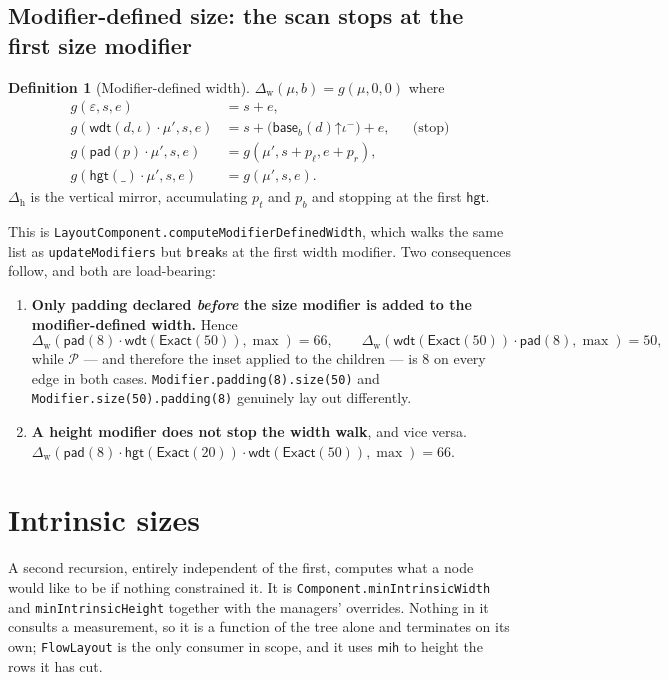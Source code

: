 \documentclass[11pt,a4paper]{article}
\newcommand{\Exact}{\mathsf{Exact}}
\newcommand{\pad}{\mathsf{pad}}
\newcommand{\wdt}{\mathsf{wdt}}
\newcommand{\hgt}{\mathsf{hgt}}
\newcommand{\mih}{\mathsf{mih}}
\newcommand{\Pp}{\mathcal{P}}          %
\newcommand{\Dw}{\Delta_{\mathrm{w}}}
\newcommand{\Dh}{\Delta_{\mathrm{h}}}
\newcommand{\base}{\mathsf{base}}
\newcommand{\clampL}{\mathord{\uparrow}}
\newcommand{\jv}[1]{\texttt{#1}}       %
\theoremstyle{definition}
\newtheorem{definition}{Definition}[section]
\theoremstyle{plain}
\theoremstyle{remark}
\begin{document}
\subsection{Modifier-defined size: the scan stops at the first size modifier}
\label{sec:orderquirk}

\begin{definition}[Modifier-defined width]
$\Dw(\mu, b) = g(\mu, 0, 0)$ where
\[
  \begin{aligned}
    g(\varepsilon, s, e) &= s + e, \\
    g(\wdt(d,\iota)\cdot\mu', s, e) &= s + \bigl(\base_b(d) \clampL \iota^-\bigr) + e,
      &&\text{(stop)} \\
    g(\pad(p)\cdot\mu', s, e) &= g(\mu', s + p_\ell, e + p_r), \\
    g(\hgt(\_)\cdot\mu', s, e) &= g(\mu', s, e).
  \end{aligned}
\]
$\Dh$ is the vertical mirror, accumulating $p_t$ and $p_b$ and stopping at the
first $\hgt$.
\end{definition}

This is \jv{LayoutComponent.computeModifierDefinedWidth}, which walks the same
list as \jv{updateModifiers} but \jv{break}s at the first width modifier. Two
consequences follow, and both are load-bearing:

\begin{enumerate}[leftmargin=1.6em]
  \item \textbf{Only padding declared \emph{before} the size modifier is added
    to the modifier-defined width.} Hence
    \[
      \Dw(\pad(8)\cdot\wdt(\Exact(50)), \max) = 66,
      \qquad
      \Dw(\wdt(\Exact(50))\cdot\pad(8), \max) = 50,
    \]
    while $\Pp$ --- and therefore the inset applied to the children --- is $8$ on
    every edge in both cases. \jv{Modifier.padding(8).size(50)} and
    \jv{Modifier.size(50).padding(8)} genuinely lay out differently.
  \item \textbf{A height modifier does not stop the width walk}, and vice versa.
    $\Dw(\pad(8)\cdot\hgt(\Exact(20))\cdot\wdt(\Exact(50)), \max) = 66$.
\end{enumerate}

\section{Intrinsic sizes}
\label{sec:intrinsic}

A second recursion, entirely independent of the first, computes what a node
would like to be if nothing constrained it. It is \jv{Component.minIntrinsicWidth}
and \jv{minIntrinsicHeight} together with the managers' overrides. Nothing in it
consults a measurement, so it is a function of the tree alone and terminates on
its own; \jv{FlowLayout} is the only consumer in scope, and it uses $\mih$ to
height the rows it has cut.
\end{document}
